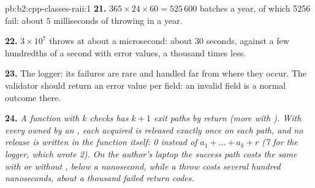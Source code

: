\begin{solution}{pb:b2:cpp-classes-raii:1}
\textbf{21.} $365 \times 24 \times 60 = 525\,600$ batches a year, of which 5256 fail: about $5$ milliseconds of
throwing in a year.

\textbf{22.} $3 \times 10^7$ throws at about a microsecond: about 30 seconds, against a few hundredths of a second
with error values, a thousand times less.

\textbf{23.} The logger: its failures are rare and handled far from where they occur. The validator should return
an error value per field: an invalid field is a normal outcome there.

\textbf{24.} \emph{A function with $k$ checks has $k + 1$ exit paths by return (more with ). With every
 owned by an , each acquired  is released exactly once on each path, and no release is written
in the function itself: 0 instead of $a_1 + \dots + a_k + r$ (7 for the logger, which wrote 2). On the author's
laptop the success path costs the same with or without , below a nanosecond, while a throw costs several
hundred nanoseconds, about a thousand failed return codes.}
\end{solution}
